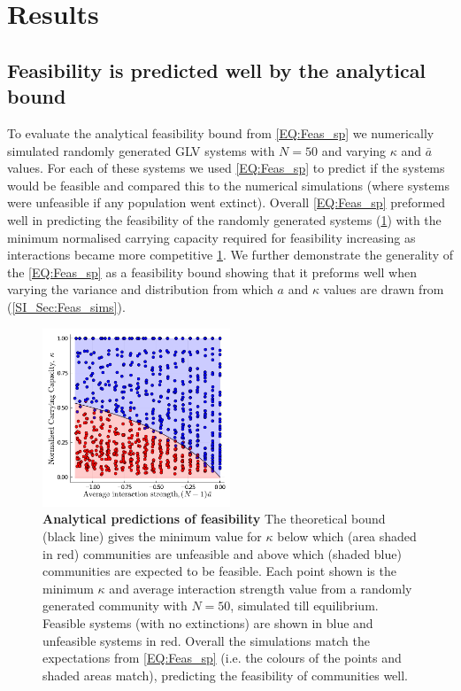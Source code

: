\documentclass{article}
\begin{document}
\section{Results}

\subsection{Feasibility is predicted well by the analytical bound}

To evaluate the analytical feasibility bound from \cref{EQ:Feas_sp} we numerically simulated randomly generated GLV systems with $N = 50$ and varying $\kappa$ and $\bar{a}$ values. For each of these systems we used \cref{EQ:Feas_sp} to predict if the systems would be feasible and compared this to the numerical simulations (where systems were unfeasible if any population went extinct). Overall \cref{EQ:Feas_sp} preformed well in predicting the feasibility of the randomly generated systems (\cref{Fig:Feasability_Bound}) with the minimum normalised carrying capacity required for feasibility increasing as interactions became more competitive \cref{Fig:Feasability_Bound}. We further demonstrate the generality of the \cref{EQ:Feas_sp} as a feasibility bound showing that it preforms well when varying the variance and distribution from which $a$ and $\kappa$ values are drawn from (\cref{SI_Sec:Feas_sims}). 

\begin{figure}[h] 
    \centering
    \includegraphics[width = 0.5\textwidth]{docs/Figures/Fig_1.pdf}
    \caption[width = \textwidth]{\textbf{Analytical predictions of feasibility} The theoretical bound (black line) gives the minimum value for $\kappa$ below which (area shaded in red) communities are unfeasible and above which (shaded blue) communities are expected to be feasible. Each point shown is the minimum $\kappa$ and average interaction strength value from a randomly generated community with $N=50$, simulated till equilibrium. Feasible systems (with no extinctions) are shown in blue and unfeasible systems in red. Overall the simulations match the expectations from \cref{EQ:Feas_sp} (i.e. the colours of the points and shaded areas match), predicting the feasibility of communities well.}
    \label{Fig:Feasability_Bound}
\end{figure}
\end{document}

